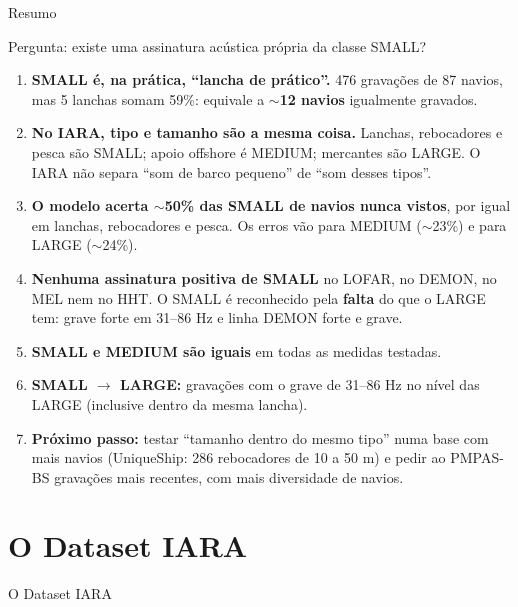 \documentclass[aspectratio=169]{beamer}
\begin{document}
\begin{frame}{Resumo}
    \footnotesize
    \begin{block}{\small Pergunta: existe uma assinatura acústica própria da classe SMALL?}
        \scriptsize
        \begin{enumerate}
            \setlength{\itemsep}{2pt}
            \item \textbf{SMALL é, na prática, ``lancha de prático''.} 476 gravações de 87 navios, mas 5 lanchas somam 59\%: equivale a \textbf{$\sim$12 navios} igualmente gravados.
            \item \textbf{No IARA, tipo e tamanho são a mesma coisa.} Lanchas, rebocadores e pesca são SMALL; apoio offshore é MEDIUM; mercantes são LARGE. O IARA não separa ``som de barco pequeno'' de ``som desses tipos''.
            \item \textbf{O modelo acerta $\sim$50\% das SMALL de navios nunca vistos}, por igual em lanchas, rebocadores e pesca. Os erros vão para MEDIUM ($\sim$23\%) e para LARGE ($\sim$24\%).
            \item \textbf{Nenhuma assinatura positiva de SMALL} no LOFAR, no DEMON, no MEL nem no HHT. O SMALL é reconhecido pela \textbf{falta} do que o LARGE tem: grave forte em 31--86 Hz e linha DEMON forte e grave.
            \item \textbf{SMALL e MEDIUM são iguais} em todas as medidas testadas.
            \item \textbf{SMALL $\to$ LARGE:} gravações com o grave de 31--86 Hz no nível das LARGE (inclusive dentro da mesma lancha).
            \item \textbf{Próximo passo:} testar ``tamanho dentro do mesmo tipo'' numa base com mais navios (UniqueShip: 286 rebocadores de 10 a 50 m) e pedir ao PMPAS-BS gravações mais recentes, com mais diversidade de navios.
        \end{enumerate}
    \end{block}
\end{frame}

\section{O Dataset IARA}

\begin{frame}
    \centering
    \huge O Dataset IARA
\end{frame}
\end{document}
